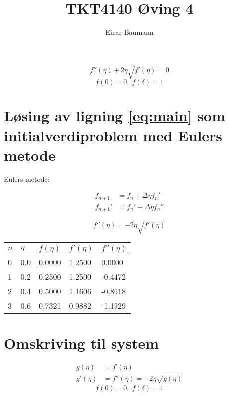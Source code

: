 

\usepackage{cancel}

\DeclareMathOperator\erf{erf}


\author{Einar Baumann}
\title{TKT4140 Øving 4}
\maketitle

\begin{equation}
  f''(\eta) + 2\eta \sqrt{f'(\eta)} = 0
  \label{eq:main}
\end{equation}
\begin{equation*}
  f(0) = 0, \; f(\delta) = 1
\end{equation*}

\pagebreak

\section{Løsing av ligning \eqref{eq:main} som initialverdiproblem med Eulers metode} %
\label{sec:euler}

Eulers metode:

\begin{align}
  f_{n+1}  &= f_n + \Delta\eta f_n' \label{eq:euler} \\
  f_{n+1}' &= f_n' + \Delta\eta f_n''
\end{align}

\begin{equation}
  f''(\eta) = -2\eta \sqrt{f'(\eta)}
\end{equation}

\begin{center}
  \begin{tabular}{ll|lll}
  \toprule
  $n$ & $\eta$ & $f(\eta)$ & $f'(\eta)$ & $f''(\eta)$ \\
  \midrule
  0   & 0.0    & 0.0000    & 1.2500     & 0.0000      \\
  1   & 0.2    & 0.2500    & 1.2500     & -0.4472     \\
  2   & 0.4    & 0.5000    & 1.1606     & -0.8618     \\
  3   & 0.6    & 0.7321    & 0.9882     & -1.1929     \\
  \bottomrule
  \end{tabular}
\end{center}



\section{Omskriving til system} %
\label{sec:omskriving_til_system}
\begin{align}
  g(\eta)  &= f'(\eta) \\
  g'(\eta) &= f''(\eta) = -2\eta \sqrt{g(\eta)}
\end{align}
\begin{equation*}
  f(0) = 0, \; f(\delta) = 1
\end{equation*}

